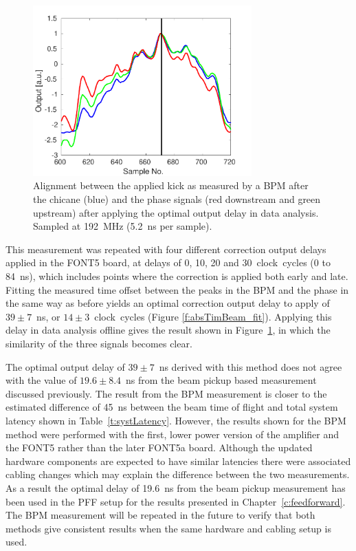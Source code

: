 \begin{figure}
  \centering
  \includegraphics[width=0.75\textwidth]{Figures/commissioning/absTimBeam_opt}
  \caption{Alignment between the applied kick as measured by a BPM after the chicane (blue) and the phase signals (red downstream and green upstream) after applying the optimal output delay in data analysis. Sampled at 192~MHz (5.2~ns per sample).}
  \label{f:absTimBeam_opt}
\end{figure}

This measurement was repeated with four different correction output delays applied in the FONT5 board, at delays of 0, 10, 20 and 30~clock~cycles (0 to 84~ns), which includes points where the correction is applied both early and late. Fitting the measured time offset between the peaks in the BPM and the phase in the same way as before yields an optimal correction output delay to apply of \(39\pm7\)~ns, or \(14\pm3\)~clock~cycles (Figure \ref{f:absTimBeam_fit}). Applying this delay in data analysis offline gives the result shown in Figure~\ref{f:absTimBeam_opt}, in which the similarity of the three signals becomes clear.

The optimal output delay of \(39\pm7\)~ns derived with this method does not agree with the value of \(19.6\pm8.4\)~ns from the beam pickup based measurement discussed previously.
The result from the BPM measurement is closer to the estimated difference of 45~ns between the beam time of flight and total system latency shown in Table~\ref{t:systLatency}. However, the results shown for the BPM method were performed with the first, lower power version of the amplifier and the FONT5 rather than the later FONT5a board. 
Although the updated hardware components are expected to have similar latencies there were associated cabling changes which may explain the difference between the two measurements. 
As a result the optimal delay of 19.6~ns from the beam pickup measurement has been used in the PFF setup for the results presented in Chapter~\ref{c:feedforward}.
The BPM measurement will be repeated in the future to verify that both methods give consistent results when the same hardware and cabling setup is used.

